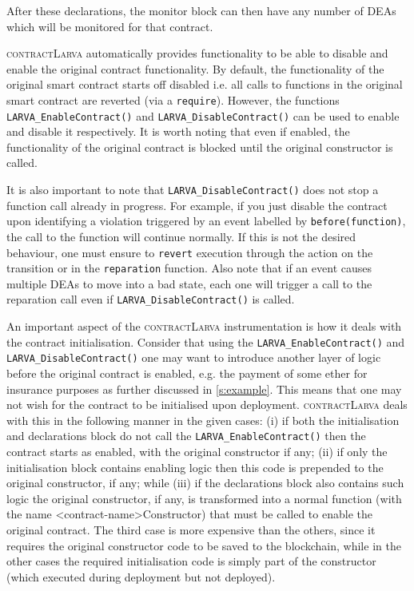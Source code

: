 \documentclass{article}
\newcommand{\contractlarva}{\textsc{contractLarva}\xspace}
\begin{document}
  After these declarations, the monitor block can then have any number of DEAs which will be monitored for that contract. 
 
 \contractlarva automatically provides functionality to be able to disable and enable the original contract functionality. By default, the functionality of the original smart contract starts off disabled i.e. all calls to functions in the original smart contract are reverted (via a \texttt{require}). However, the functions \texttt{LARVA\_EnableContract()} and \texttt{LARVA\_DisableContract()} can be used to enable and disable it respectively. It is worth noting that even if enabled, the functionality of the original contract is blocked until the original constructor is called.

  It is also important to note that \texttt{LARVA\_DisableContract()} does not stop a function call already in progress. For example, if you just disable the contract upon identifying a violation triggered by an event labelled by \texttt{before(function)}, the call to the function will continue normally. If this is not the desired behaviour, one must ensure to \texttt{revert} execution through the action on the transition or in the \texttt{reparation} function. Also note that if an event causes multiple DEAs to move into a bad state, each one will trigger a call to the reparation call even if \texttt{LARVA\_DisableContract()} is called.
  
  An important aspect of the \contractlarva instrumentation is how it deals with the contract initialisation. Consider that using the \texttt{LARVA\_EnableContract()} and \texttt{LARVA\_DisableContract()} one may want to introduce another layer of logic before the original contract is enabled, e.g. the payment of some ether for insurance purposes as further discussed in \ref{s:example}. This means that one may not wish for the contract to be initialised upon deployment. \contractlarva deals with this in the following manner in the given cases: (i) if both the initialisation and declarations block do not call the \texttt{LARVA\_EnableContract()} then the contract starts as enabled, with the original constructor if any; (ii) if only the initialisation block contains enabling logic then this code is prepended to the original constructor, if any; while (iii) if the declarations block also contains such logic the original constructor, if any, is transformed into a normal function (with the name <contract-name>Constructor) that must be called to enable the original contract. The third case is more expensive than the others, since it requires the original constructor code to be saved to the blockchain, while in the other cases the required initialisation code is simply part of the constructor (which executed during deployment but not deployed).
\end{document}
